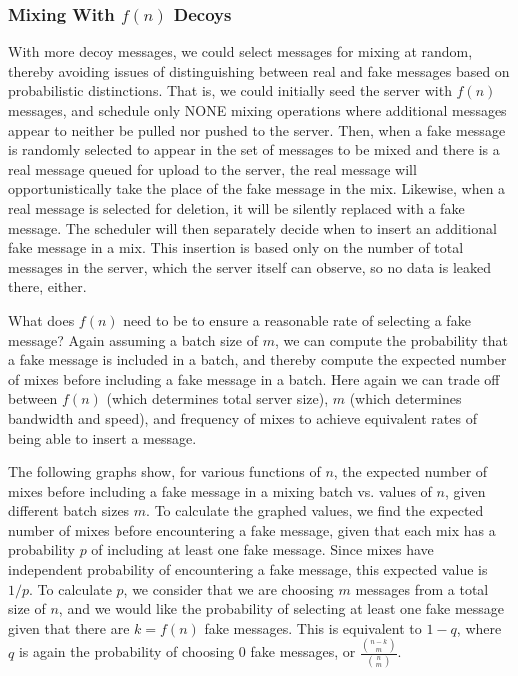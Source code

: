 \documentclass[pageno]{jpaper}
\begin{document}
\subsubsection{Mixing With \texorpdfstring{$f(n)$}{f(n)} Decoys}
\label{fofn}
With more decoy messages, we could select messages for mixing at random, thereby avoiding issues of distinguishing between real and fake messages based on probabilistic distinctions. That is, we could initially seed the server with $f(n)$ messages, and schedule only NONE mixing operations where additional messages appear to neither be pulled nor pushed to the server. Then, when a fake message is randomly selected to appear in the set of messages to be mixed and there is a real message queued for upload to the server, the real message will opportunistically take the place of the fake message in the mix. Likewise, when a real message is selected for deletion, it will be silently replaced with a fake message. The scheduler will then separately decide when to insert an additional fake message in a mix. This insertion is based only on the number of total messages in the server, which the server itself can observe, so no data is leaked there, either.

What does $f(n)$ need to be to ensure a reasonable rate of selecting a fake message? Again assuming a batch size of $m$, we can compute the probability that a fake message is included in a batch, and thereby compute the expected number of mixes before including a fake message in a batch. Here again we can trade off between $f(n)$ (which determines total server size), $m$ (which determines bandwidth and speed), and frequency of mixes to achieve equivalent rates of being able to insert a message.

The following graphs show, for various functions of $n$, the expected number of mixes before including a fake message in a mixing batch vs. values of $n$, given different batch sizes $m$. To calculate the graphed values, we find the expected number of mixes before encountering a fake message, given that each mix has a probability $p$ of including at least one fake message. Since mixes have independent probability of encountering a fake message, this expected value is $1/p$. To calculate $p$, we consider that we are choosing $m$ messages from a total size of $n$, and we would like the probability of selecting at least one fake message given that there are $k=f(n)$ fake messages. This is equivalent to $1-q$, where $q$ is again the probability of choosing 0 fake messages, or $\frac{{{n-k}\choose m}}{{n \choose m}}$.
\end{document}
